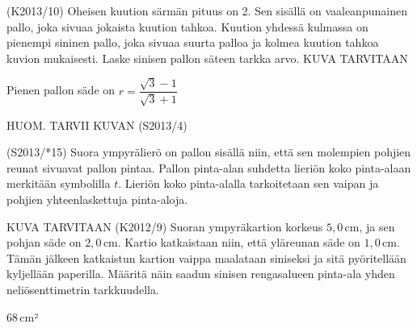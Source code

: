 \begin{tehtava} 
(K2013/10) Oheisen kuution särmän pituus on 2. Sen sisällä on vaaleanpunainen pallo, joka sivuaa jokaista kuution tahkoa. Kuution yhdessä kulmassa on pienempi sininen pallo, joka sivuaa suurta palloa ja kolmea kuution tahkoa kuvion mukaisesti. Laske sinisen pallon säteen tarkka arvo.
KUVA TARVITAAN
  \begin{vastaus}
  Pienen pallon säde on $r=\dfrac{\sqrt{3}-1}{\sqrt{3}+1}$
  \end{vastaus}
\end{tehtava}

\begin{tehtava} 
HUOM. TARVII KUVAN 
(S2013/4) 
				\begin{vastaus}
				\end{vastaus}
\end{tehtava}

\begin{tehtava} 
(S2013/*15) Suora ympyrälierö on pallon sisällä niin, että sen molempien pohjien reunat sivuavat pallon pintaa. Pallon pinta-alan suhdetta lieriön koko pinta-alaan merkitään symbolilla $t$. Lieriön koko pinta-alalla tarkoitetaan sen vaipan ja pohjien yhteenlaskettuja pinta-aloja.
				\begin{vastaus}
				\alakohdat{
				 § $x=t\pm\sqrt{t^2+2t-4}$
				 § $0<t<-1+\sqrt{5}$
				 § $t\geq2$
				 § $\sqrt{5}-1<t<2$
				}
				\end{vastaus}
\end{tehtava}

\begin{tehtava} 
KUVA TARVITAAN
(K2012/9) Suoran ympyräkartion korkeus $5,0$\,cm, ja sen pohjan säde on $2,0$\,cm. Kartio katkaistaan niin, että yläreunan säde on $1,0$\,cm. Tämän jälkeen katkaistun kartion vaippa maalataan siniseksi ja sitä pyöritellään kyljellään paperilla. Määritä näin saadun sinisen rengasalueen pinta-ala yhden neliösenttimetrin tarkkuudella.
  \begin{vastaus}
  $68$\,cm²
  \end{vastaus}
\end{tehtava}

